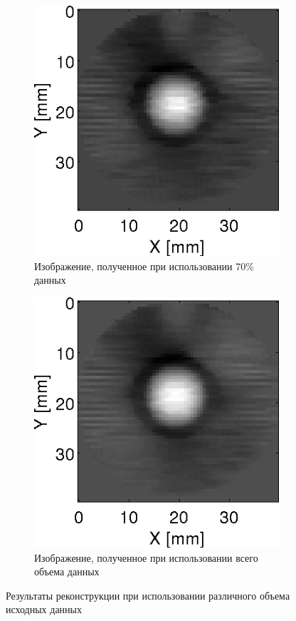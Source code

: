 \documentclass[14pt]{matmex-diploma}
\begin{document}
\begin{figure}[h]
\begin{subfigure}{.32\textwidth}
    \includegraphics[width=1\linewidth]{pics/ref_kwave_70p.png}
    \caption{Изображение, полученное при использовании 70\% данных}
    \label{fig:percents_70}
\end{subfigure}
\begin{subfigure}{.32\textwidth}
    \centering
    \includegraphics[width=1\linewidth]{pics/ref_kwave_99.9p.png}
    \caption{Изображение, полученное при использовании всего объема данных}
    \label{fig:percents_100}
\end{subfigure}

    \caption{Результаты реконструкции при использовании различного объема исходных данных}
    \label{fig:reconstruction_exp1}
\end{figure}
\end{document}
